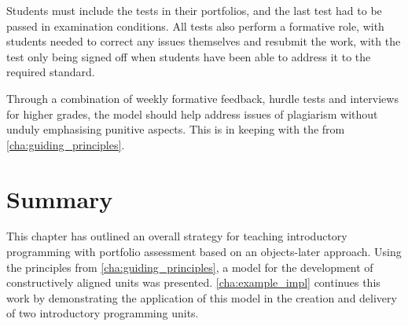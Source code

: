 Students must include the tests in their portfolios, and the last test had to be passed in examination conditions. All tests also perform a formative role, with students needed to correct any issues themselves and resubmit the work, with the test only being signed off when students have been able to address it to the required standard.

Through a combination of weekly formative feedback, hurdle tests and interviews for higher grades, the model should help address issues of plagiarism without unduly emphasising punitive aspects. This is in keeping with the  from \cref{cha:guiding_principles}.


\section{Summary} %
\label{sec:summary}

This chapter has outlined an overall strategy for teaching introductory programming with portfolio assessment based on an objects-later approach. Using the principles from \cref{cha:guiding_principles}, a model for the development of constructively aligned units was presented. \cref{cha:example_impl} continues this work by demonstrating the application of this model in the creation and delivery of two introductory programming units.


